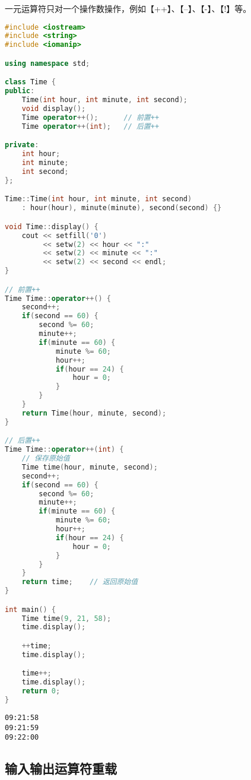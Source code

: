 一元运算符只对一个操作数操作，例如【++】、【--】、【-】、【!】等。 \\


\begin{lstlisting}[language=C++]
#include <iostream>
#include <string>
#include <iomanip>

using namespace std;

class Time {
public:
    Time(int hour, int minute, int second);
    void display();
    Time operator++();      // 前置++
    Time operator++(int);   // 后置++

private:
    int hour;
    int minute;
    int second;
};

Time::Time(int hour, int minute, int second) 
    : hour(hour), minute(minute), second(second) {}

void Time::display() {
    cout << setfill('0')
         << setw(2) << hour << ":"
         << setw(2) << minute << ":"
         << setw(2) << second << endl;
}

// 前置++
Time Time::operator++() {
    second++;
    if(second == 60) {
        second %= 60;
        minute++;
        if(minute == 60) {
            minute %= 60;
            hour++;
            if(hour == 24) {
                hour = 0;
            }
        }
    }
    return Time(hour, minute, second);
}

// 后置++
Time Time::operator++(int) {
    // 保存原始值
    Time time(hour, minute, second);
    second++;
    if(second == 60) {
        second %= 60;
        minute++;
        if(minute == 60) {
            minute %= 60;
            hour++;
            if(hour == 24) {
                hour = 0;
            }
        }
    }
    return time;    // 返回原始值
}

int main() {
    Time time(9, 21, 58);
    time.display();

    ++time;
    time.display();

    time++;
    time.display();
    return 0;
}
\end{lstlisting}

\begin{tcolorbox}
	\begin{verbatim}
09:21:58
09:21:59
09:22:00
	\end{verbatim}
\end{tcolorbox}

\subsection{输入输出运算符重载}

